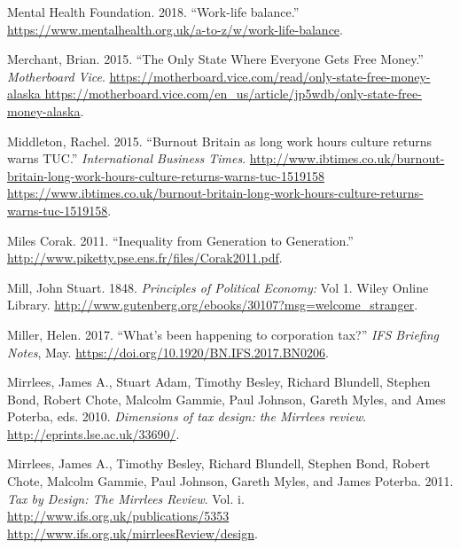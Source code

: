 \documentclass[]{tufte-handout}
\begin{document}
\leavevmode\hypertarget{ref-MentalHealthFoundation2018}{}%
Mental Health Foundation. 2018. ``Work-life balance.''
\url{https://www.mentalhealth.org.uk/a-to-z/w/work-life-balance}.

\leavevmode\hypertarget{ref-BrianMerchant2015}{}%
Merchant, Brian. 2015. ``The Only State Where Everyone Gets Free
Money.'' \emph{Motherboard Vice}.
\href{https://motherboard.vice.com/read/only-state-free-money-alaska\%20https://motherboard.vice.com/en_us/article/jp5wdb/only-state-free-money-alaska}{https://motherboard.vice.com/read/only-state-free-money-alaska https://motherboard.vice.com/en\_us/article/jp5wdb/only-state-free-money-alaska}.

\leavevmode\hypertarget{ref-RachelMiddleton2015}{}%
Middleton, Rachel. 2015. ``Burnout Britain as long work hours culture
returns warns TUC.'' \emph{International Business Times}.
\href{http://www.ibtimes.co.uk/burnout-britain-long-work-hours-culture-returns-warns-tuc-1519158\%20https://www.ibtimes.co.uk/burnout-britain-long-work-hours-culture-returns-warns-tuc-1519158}{http://www.ibtimes.co.uk/burnout-britain-long-work-hours-culture-returns-warns-tuc-1519158 https://www.ibtimes.co.uk/burnout-britain-long-work-hours-culture-returns-warns-tuc-1519158}.

\leavevmode\hypertarget{ref-MilesCorak2011}{}%
Miles Corak. 2011. ``Inequality from Generation to Generation.''
\url{http://www.piketty.pse.ens.fr/files/Corak2011.pdf}.

\leavevmode\hypertarget{ref-mill1848principles}{}%
Mill, John Stuart. 1848. \emph{Principles of Political Economy:} Vol 1.
Wiley Online Library.
\url{http://www.gutenberg.org/ebooks/30107?msg=welcome_stranger}.

\leavevmode\hypertarget{ref-Miller2017}{}%
Miller, Helen. 2017. ``What's been happening to corporation tax?''
\emph{IFS Briefing Notes}, May.
\url{https://doi.org/10.1920/BN.IFS.2017.BN0206}.

\leavevmode\hypertarget{ref-Mirrlees2010d}{}%
Mirrlees, James A., Stuart Adam, Timothy Besley, Richard Blundell,
Stephen Bond, Robert Chote, Malcolm Gammie, Paul Johnson, Gareth Myles,
and Ames Poterba, eds. 2010. \emph{Dimensions of tax design: the
Mirrlees review}. \url{http://eprints.lse.ac.uk/33690/}.

\leavevmode\hypertarget{ref-Mirrlees2011}{}%
Mirrlees, James A., Timothy Besley, Richard Blundell, Stephen Bond,
Robert Chote, Malcolm Gammie, Paul Johnson, Gareth Myles, and James
Poterba. 2011. \emph{Tax by Design: The Mirrlees Review}. Vol. i.
\href{http://www.ifs.org.uk/publications/5353\%20http://www.ifs.org.uk/mirrleesReview/design}{http://www.ifs.org.uk/publications/5353 http://www.ifs.org.uk/mirrleesReview/design}.
\end{document}
